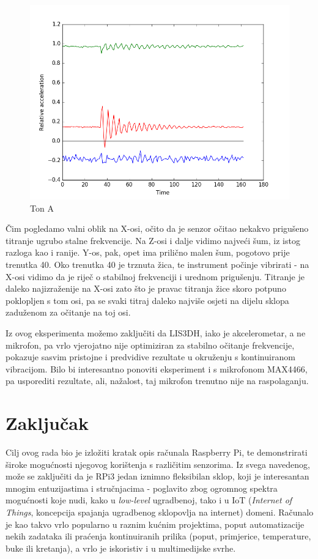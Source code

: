 \documentclass[12pt,a4paper]{article}
\begin{document}
	\begin{figure}[h!]
	  \includegraphics[width=\linewidth]{slike/bass3.png}
	  \caption{Ton A}
	  \label{fig:bass3}
	\end{figure}

	Čim pogledamo valni oblik na X-osi, očito da je senzor očitao nekakvo prigušeno titranje ugrubo stalne frekvencije. Na Z-osi i dalje vidimo najveći šum, iz istog razloga kao i ranije. Y-os, pak, opet ima prilično malen šum, pogotovo prije trenutka 40. Oko trenutka 40 je trznuta žica, te instrument počinje vibrirati - na X-osi vidimo da je riječ o stabilnoj frekvenciji i urednom prigušenju. Titranje je daleko najizraženije na X-osi zato što je pravac titranja žice skoro potpuno poklopljen s tom osi, pa se svaki titraj daleko najviše osjeti na dijelu sklopa zaduženom za očitanje na toj osi.
	\par Iz ovog eksperimenta možemo zaključiti da LIS3DH, iako je akcelerometar, a ne mikrofon, pa vrlo vjerojatno nije optimiziran za stabilno očitanje frekvencije, pokazuje sasvim pristojne i predvidive rezultate u okruženju s kontinuiranom vibracijom. Bilo bi interesantno ponoviti eksperiment i s mikrofonom MAX4466, pa usporediti rezultate, ali, nažalost, taj mikrofon trenutno nije na raspolaganju.



\newpage
\section{Zaključak}
	Cilj ovog rada bio je izložiti kratak opis računala Raspberry Pi, te demonstrirati široke mogućnosti njegovog korištenja s različitim senzorima. Iz svega navedenog, može se zaključiti da je RPi3 jedan iznimno fleksibilan sklop, koji je interesantan mnogim entuzijastima i stručnjacima - poglavito zbog ogromnog spektra mogućnosti koje nudi, kako u \textit{low-level} ugradbenoj, tako i u IoT (\textit{Internet of Things}, koncepcija spajanja ugradbenog sklopovlja na internet) domeni. Računalo je kao takvo vrlo popularno u raznim kućnim projektima, poput automatizacije nekih zadataka ili praćenja kontinuiranih prilika (poput, primjerice, temperature, buke ili kretanja), a vrlo je iskoristiv i u multimedijske svrhe. \\
\end{document}
